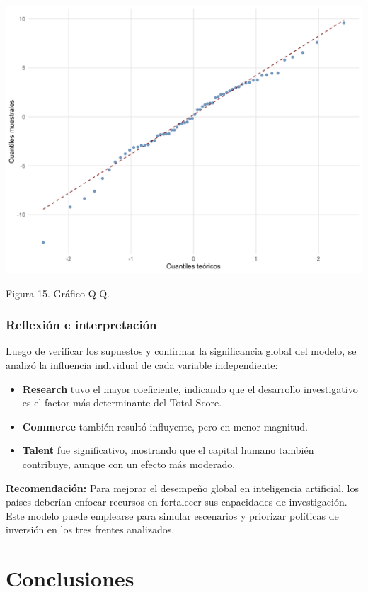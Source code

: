 \documentclass[
]{article}
\begin{document}
\begin{multicols}{2}
\begin{center}
\includegraphics[width=\linewidth]{modelo_multip_normalidad.png}
\end{center}
Figura 15. Gráfico Q-Q.


\subsubsection*{Reflexión e interpretación}

Luego de verificar los supuestos y confirmar la significancia global del modelo, se analizó la influencia individual de cada variable independiente:

\begin{itemize}
  \item \textbf{Research} tuvo el mayor coeficiente, indicando que el desarrollo investigativo es el factor más determinante del Total Score.
  \item \textbf{Commerce} también resultó influyente, pero en menor magnitud.
  \item \textbf{Talent} fue significativo, mostrando que el capital humano también contribuye, aunque con un efecto más moderado.
\end{itemize}

\textbf{Recomendación:}  
Para mejorar el desempeño global en inteligencia artificial, los países deberían enfocar recursos en fortalecer sus capacidades de investigación. Este modelo puede emplearse para simular escenarios y priorizar políticas de inversión en los tres frentes analizados.

\section{Conclusiones}


\end{multicols}
\end{document}
